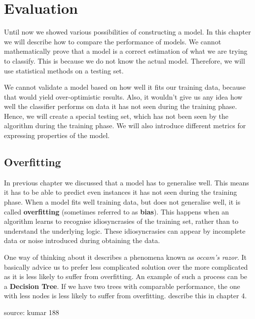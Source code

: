 \chapter{Evaluation}


\label{chap:eval}

Until now we showed various possibilities of constructing a model.
In this chapter we will describe how to compare the performance of models.
We cannot mathematically prove that a model is a correct estimation of what we are trying to classify.
This is because we do not know the actual model.
Therefore, we will use statistical methods on a testing set.

We cannot validate a model based on how well it fits our training data, because that would yield over-optimistic results.
Also, it wouldn't give us any idea how well the classifier performs on data it has not seen during the training phase.
Hence, we will create a special testing set, which has not been seen by the algorithm during the training phase.
We will also introduce different metrics for expressing properties of the model.

\section{Overfitting}

In previous chapter  we discussed that a model has to generalise well. This means it has to be able to predict even
instances it has not seen during the training phase. When a model fits well training data, but does not generalise well, it is called
{\bf overfitting} (sometimes referred to as {\bf bias}).
This happens when an algorithm learns to recognise idiosyncrasies of the training set, rather than to understand the underlying logic.
These idiosyncrasies can appear by incomplete data or noise introduced during obtaining the data.

One way of thinking about it describes a phenomena known as {\it occam's razor}. 
It basically advice us to prefer less complicated solution over the more complicated as it is less likely to suffer from overfitting.
An example of such a process can be a {\bf Decision Tree}.
If we have two trees with comparable performance, the one with less nodes is less likely to suffer from overfitting. \citet{TanBachKum08} describe this in chapter 4.

{source: kumar 188}


